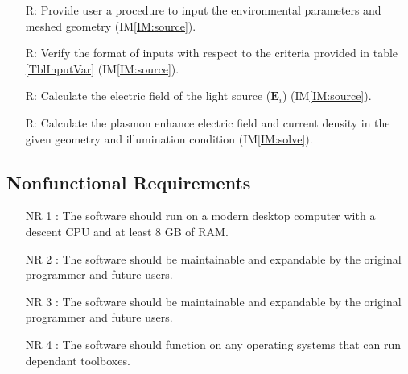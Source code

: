 \documentclass[12pt]{article}
\newcounter{reqnum} %
\begin{document}
	\noindent \begin{itemize}
		
		\item[R\refstepcounter{reqnum}\thereqnum \label{R_1}:] Provide user a procedure to input the environmental parameters and meshed geometry (IM\ref{IM:source}).
		
		\item[R\refstepcounter{reqnum}\thereqnum \label{R_2}:] Verify the
		format of inputs with respect to the criteria provided in table \ref{TblInputVar} (IM\ref{IM:source}).
		
		\item[R\refstepcounter{reqnum}\thereqnum \label{R_3}:] Calculate the
		electric field of the light source ($\textbf{E}_i$)
		(IM\ref{IM:source}).
		
		\item[R\refstepcounter{reqnum}\thereqnum \label{R_4}:] Calculate the
		plasmon enhance electric field and current density in the given geometry and illumination condition
		(IM\ref{IM:solve}).
		
		
		
		
		
	\end{itemize}
	
	\subsection{Nonfunctional Requirements}
	
	\begin{itemize} 
		
		\item[NR 1 \label{NR_RAM}:] The software should run on a modern
		desktop computer with a descent CPU and at least 8 GB of RAM.
		
		\item[NR 2 \label{R_update}:] The software should be maintainable and
		expandable by the original programmer and future users.
		
		
		\item[NR 3 \label{R_update}:] The software should be maintainable and
		expandable by the original programmer and future users.
		
		\item[NR 4 \label{R_compatibility}:] The software should function on any
		operating systems that can run dependant toolboxes. \end{itemize}
	
\end{document}
